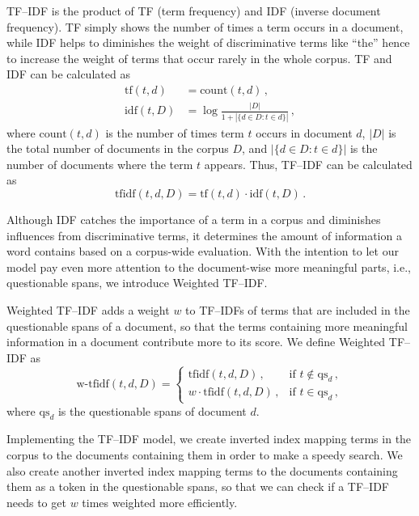 TF--IDF is the product of TF (term frequency) and IDF (inverse document frequency). TF simply shows the number of times a term occurs in a document, while IDF helps to diminishes the weight of discriminative terms like ``the'' hence to increase the weight of terms that occur rarely in the whole corpus. TF and IDF can be calculated as
\begin{align*}
    \text{tf} (t,d) &= \text{count} (t,d) \,, \\
    \mathrm{idf}(t, D) &= \log \frac{|D|}{1+|\{d \in D: t \in d\}|} \,,
\end{align*}
where $\text{count} (t,d)$ is the number of times term $t$ occurs in document $d$, $|D|$ is the total number of documents in the corpus $D$, and
$|\{d \in D: t \in d\}|$ is the number of documents where the term $t$ appears. Thus, TF--IDF can be calculated as
\begin{displaymath}
    \text{tfidf} (t,d,D)=\text{tf} (t,d)\cdot \text{idf} (t,D) \,.
\end{displaymath}

Although IDF catches the importance of a term in a corpus and diminishes influences from discriminative terms, it determines the amount of information a word contains based on a corpus-wide evaluation. With the intention to let our model pay even more attention to the document-wise more meaningful parts, i.e., questionable spans, we introduce Weighted TF--IDF.

Weighted TF--IDF adds a weight $w$ to TF--IDFs of terms that are included in the questionable spans of a document, so that the terms containing more meaningful information in a document contribute more to its score. We define Weighted TF--IDF as
\begin{displaymath}
    \text{w-tfidf} (t,d,D) =
    \begin{cases}
        \text{tfidf} (t,d,D) \,, & \text{if $t \notin \text{qs}_d$}\,, \\
        w \cdot \text{tfidf} (t,d,D) \,, & \text{if $t \in \text{qs}_d$}\,,
    \end{cases}
\end{displaymath}
where $\text{qs}_d$ is the questionable spans of document $d$.

Implementing the TF--IDF model, we create inverted index mapping terms in the corpus to the documents containing them in order to make a speedy search. We also create another inverted index mapping terms to the documents containing them as a token in the questionable spans, so that we can check if a TF--IDF needs to get $w$ times weighted more efficiently.


